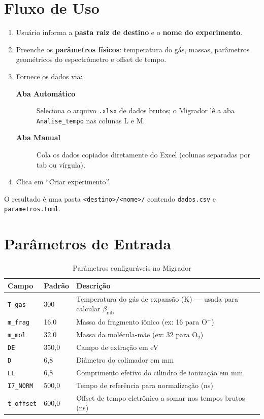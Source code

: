 \documentclass[12pt,a4paper]{report}
\newcommand{\code}[1]{\texttt{#1}}
\begin{document}
\section{Fluxo de Uso}

\begin{enumerate}
  \item Usuário informa a \textbf{pasta raiz de destino} e o \textbf{nome do experimento}.
  \item Preenche os \textbf{parâmetros físicos}: temperatura do gás, massas,
    parâmetros geométricos do espectrômetro e offset de tempo.
  \item Fornece os dados via:
    \begin{description}
      \item[\textbf{Aba Automático}] Seleciona o arquivo \texttt{.xlsx} de dados brutos;
        o Migrador lê a aba \texttt{Analise\_tempo} nas colunas L e M.
      \item[\textbf{Aba Manual}] Cola os dados copiados diretamente do Excel
        (colunas separadas por tab ou vírgula).
    \end{description}
  \item Clica em ``Criar experimento''.
\end{enumerate}

O resultado é uma pasta \texttt{<destino>/<nome>/} contendo \texttt{dados.csv}
e \texttt{parametros.toml}.

\section{Parâmetros de Entrada}

\begin{table}[h!]
  \centering
  \caption{Parâmetros configuráveis no Migrador}
  \begin{tabular}{llp{6cm}}
    \toprule
    \textbf{Campo} & \textbf{Padrão} & \textbf{Descrição} \\
    \midrule
    \code{T\_gas} & 300 & Temperatura do gás de expansão (K) — usada para calcular $\beta_{\text{mb}}$ \\
    \code{m\_frag} & 16,0 & Massa do fragmento iônico (ex: 16 para O$^+$) \\
    \code{m\_mol} & 32,0 & Massa da molécula-mãe (ex: 32 para O$_2$) \\
    \code{DE} & 350,0 & Campo de extração em eV \\
    \code{D} & 6,8 & Diâmetro do colimador em mm \\
    \code{LL} & 6,8 & Comprimento efetivo do cilindro de ionização em mm \\
    \code{I7\_NORM} & 500,0 & Tempo de referência para normalização (ns) \\
    \code{t\_offset} & 600,0 & Offset de tempo eletrônico a somar nos tempos brutos (ns) \\
    \bottomrule
  \end{tabular}
\end{table}
\end{document}
